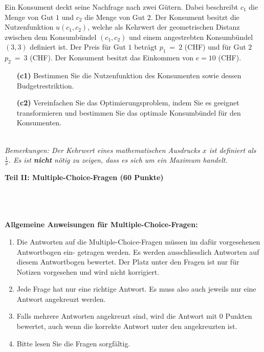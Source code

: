 \ \\
\subsection*{}
Ein Konsument deckt seine Nachfrage nach zwei Gütern. Dabei beschreibt $ c_1 $ die Menge von Gut $ 1 $ und $ c_2 $ die Menge von Gut $ 2 $. Der Konsument besitzt die Nutzenfunktion $ u(c_1,c_2) $, welche als Kehrwert der geometrischen Distanz zwischen dem Konsumbündel $ (c_1,c_2) $ und einem angestrebten Konsumbündel $ (3,3) $ definiert ist. Der Preis für Gut $ 1 $ beträgt $ p_1 \ = \ 2 $ (CHF) und für Gut $ 2 $ $ p_2 \ = \ 3 $ (CHF). Der Konsument besitzt das Einkommen von $ e = 10 $ (CHF).
\begin{enumerate}
	\item[\textbf{(c1)}] 
	Bestimmen Sie die Nutzenfunktion des Konsumenten sowie dessen Budgetrestriktion.
	\item[\textbf{(c2)}]
	Vereinfachen Sie das Optimierungsproblem, indem Sie es geeignet transformieren und bestimmen Sie das optimale Konsumbündel für den Konsumenten.
\end{enumerate}
\ \\
\textit{Bemerkungen: Der Kehrwert eines mathematischen Ausdrucks $ x $ ist definiert als $ \frac{1}{x} $. Es ist \textbf{nicht} nötig zu zeigen, dass es sich um ein Maximum handelt.}

\newpage


\begin{Large}
\textbf{Teil II: Multiple-Choice-Fragen (60 Punkte)}
\end{Large}
\\
\\
\\
\textbf{Allgemeine Anweisungen für Multiple-Choice-Fragen:}
\\
\renewcommand{\labelenumi}{(\roman{enumi})}
\begin{enumerate}
\item
Die Antworten auf die Multiple-Choice-Fragen müssen im dafür vorgesehenen Antwortbogen ein-
getragen werden. Es werden ausschliesslich Antworten auf diesem Antwortbogen bewertet. Der
Platz unter den Fragen ist nur für Notizen vorgesehen und wird nicht korrigiert.

\item
Jede Frage hat nur eine richtige Antwort. Es muss also auch jeweils nur eine Antwort angekreuzt
werden.

\item
Falls mehrere Antworten angekreuzt sind, wird die Antwort mit 0 Punkten bewertet, auch wenn
die korrekte Antwort unter den angekreuzten ist.

\item
Bitte lesen Sie die Fragen sorgfältig.

\end{enumerate}
\newpage
